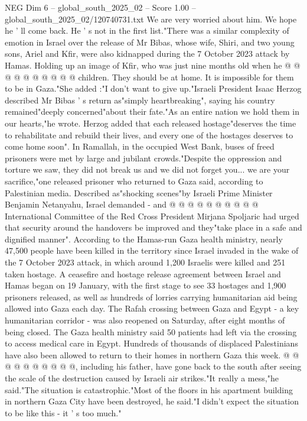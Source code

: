 \begin{textsample}{NEG Dim 6 – global\_south\_2025\_02 – Score 1.00 – global\_south\_2025\_02/120740731.txt}
We are very worried about him.
We hope he ' ll come back.
He ' s not in the first list."There was a similar complexity of emotion in Israel over the release of Mr Bibas, whose wife, Shiri, and two young sons, Ariel and Kfir, were also kidnapped during the 7 October 2023 attack by Hamas.
Holding up an image of Kfir, who was just nine months old when he @ @ @ @ @ @ @ @ @ @ children.
They should be at home.
It is impossible for them to be in Gaza."She added :"I don't want to give up."Israeli President Isaac Herzog described Mr Bibas ' s return as"simply heartbreaking", saying his country remained"deeply concerned"about their fate."As an entire nation we hold them in our hearts,"he wrote.
Herzog added that each released hostage"deserves the time to rehabilitate and rebuild their lives, and every one of the hostages deserves to come home soon".
In Ramallah, in the occupied West Bank, buses of freed prisoners were met by large and jubilant crowds."Despite the oppression and torture we saw, they did not break us and we did not forget you... we are your sacrifice,"one released prisoner who returned to Gaza said, according to Palestinian media.
Described as"shocking scenes"by Israeli Prime Minister Benjamin Netanyahu, Israel demanded - and @ @ @ @ @ @ @ @ @ @ International Committee of the Red Cross President Mirjana Spoljaric had urged that security around the handovers be improved and they"take place in a safe and dignified manner".
According to the Hamas-run Gaza health ministry, nearly 47,500 people have been killed in the territory since Israel invaded in the wake of the 7 October 2023 attack, in which around 1,200 Israelis were killed and 251 taken hostage.
A ceasefire and hostage release agreement between Israel and Hamas began on 19 January, with the first stage to see 33 hostages and 1,900 prisoners released, as well as hundreds of lorries carrying humanitarian aid being allowed into Gaza each day.
The Rafah crossing between Gaza and Egypt - a key humanitarian corridor - was also reopened on Saturday, after eight months of being closed.
The Gaza health ministry said 50 patients had left via the crossing to access medical care in Egypt.
Hundreds of thousands of displaced Palestinians have also been allowed to return to their homes in northern Gaza this week. @ @ @ @ @ @ @ @ @ @, including his father, have gone back to the south after seeing the scale of the destruction caused by Israeli air strikes."It really a mess,"he said."The situation is catastrophic."Most of the floors in his apartment building in northern Gaza City have been destroyed, he said."I didn't expect the situation to be like this - it ' s too much."

\end{textsample}
